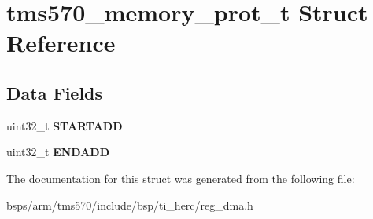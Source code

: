 \hypertarget{structtms570__memory__prot__t}{}\section{tms570\+\_\+memory\+\_\+prot\+\_\+t Struct Reference}
\label{structtms570__memory__prot__t}
\subsection*{Data Fields}
\begin{DoxyCompactItemize}
\item 
\mbox{\label{structtms570__memory__prot__t_aada7fe6986c79d4b02b8d8df47f42cb4}} 
uint32\+\_\+t {\bfseries S\+T\+A\+R\+T\+A\+DD}
\item 
\mbox{\label{structtms570__memory__prot__t_af9d13a3fe42a529b92b3073be71d98df}} 
uint32\+\_\+t {\bfseries E\+N\+D\+A\+DD}
\end{DoxyCompactItemize}


The documentation for this struct was generated from the following file\+:\begin{DoxyCompactItemize}
\item 
bsps/arm/tms570/include/bsp/ti\+\_\+herc/reg\+\_\+dma.\+h\end{DoxyCompactItemize}
